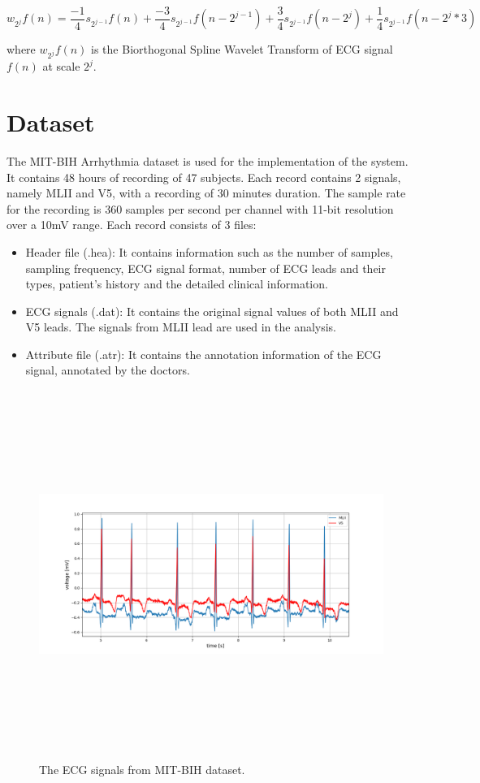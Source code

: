 \begin{equation} \label{eqn:detail}
{ w_{2^j}f(n) = \frac{-1}{4}s_{2^{j-1}}f(n) + \frac{-3}{4}s_{2^{j-1}}f(n-2^{j-1}) + \frac{3}{4}s_{2^{j-1}}f(n-2^{j}) + \frac{1}{4}s_{2^{j-1}}f(n-2^{j} * 3) }
\end{equation}

where $w_{2^j}f(n)$ is the Biorthogonal Spline Wavelet Transform of ECG signal $f(n)$ at scale $2^j$.


\section{Dataset}

The MIT-BIH Arrhythmia dataset is used for the implementation of the system. It contains 48 hours of recording of 47 subjects. Each record contains 2 signals, namely MLII and V5, with a recording of 30 minutes duration. The sample rate for the recording is 360 samples per second per channel with 11-bit resolution over a 10mV range. Each record consists of 3 files:

\begin{itemize}
	\item Header file (.hea): It contains information such as the number of samples, sampling frequency, ECG signal format, number of ECG leads and their types, patient's history and the detailed clinical information.
	
	\item ECG signals (.dat): It contains the original signal values of both MLII and V5 leads. The signals from MLII lead are used in the analysis.
	
	\item Attribute file (.atr): It contains the annotation information of the ECG signal, annotated by the doctors.
\end{itemize}


\begin{figure}[h]
	\centering
	\includegraphics[width=15cm,height=12cm,keepaspectratio=true]{images/all_signals}
	\caption{
		The ECG signals from MIT-BIH dataset.
	}
	\label{fig:all_signals}
\end{figure}

